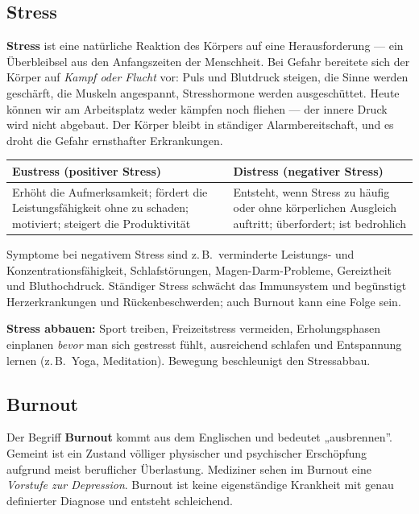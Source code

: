 \documentclass[11pt, a4paper]{article}
\begin{document}
\subsection{Stress}

\textbf{Stress} ist eine natürliche Reaktion des Körpers auf eine Herausforderung --- ein
Überbleibsel aus den Anfangszeiten der Menschheit. Bei Gefahr bereitete sich der Körper auf
\emph{Kampf oder Flucht} vor: Puls und Blutdruck steigen, die Sinne werden geschärft, die
Muskeln angespannt, Stresshormone werden ausgeschüttet. Heute können wir am Arbeitsplatz
weder kämpfen noch fliehen --- der innere Druck wird nicht abgebaut. Der Körper bleibt in
ständiger Alarmbereitschaft, und es droht die Gefahr ernsthafter Erkrankungen.

\begin{center}
\begin{tabular}{p{6.5cm} p{6.5cm}}
\toprule
\textbf{Eustress (positiver Stress)} & \textbf{Distress (negativer Stress)}\\
\midrule
Erhöht die Aufmerksamkeit; fördert die Leistungsfähigkeit ohne zu schaden; motiviert; steigert die Produktivität & Entsteht, wenn Stress zu häufig oder ohne körperlichen Ausgleich auftritt; überfordert; ist bedrohlich\\
\bottomrule
\end{tabular}
\end{center}

\medskip
Symptome bei negativem Stress sind z.\,B.\ verminderte Leistungs- und
Konzentrationsfähigkeit, Schlafstörungen, Magen-Darm-Probleme, Gereiztheit und
Bluthochdruck. Ständiger Stress schwächt das Immunsystem und begünstigt Herzerkrankungen
und Rückenbeschwerden; auch Burnout kann eine Folge sein.

\begin{merksatz}
\textbf{Stress abbauen:} Sport treiben, Freizeitstress vermeiden, Erholungsphasen
einplanen \emph{bevor} man sich gestresst fühlt, ausreichend schlafen und Entspannung
lernen (z.\,B.\ Yoga, Meditation). Bewegung beschleunigt den Stressabbau.
\end{merksatz}

\subsection{Burnout}

Der Begriff \textbf{Burnout} kommt aus dem Englischen und bedeutet „ausbrennen”. Gemeint ist
ein Zustand völliger physischer und psychischer Erschöpfung aufgrund meist beruflicher
Überlastung. Mediziner sehen im Burnout eine \emph{Vorstufe zur Depression}. Burnout ist
keine eigenständige Krankheit mit genau definierter Diagnose und entsteht schleichend.
\end{document}
